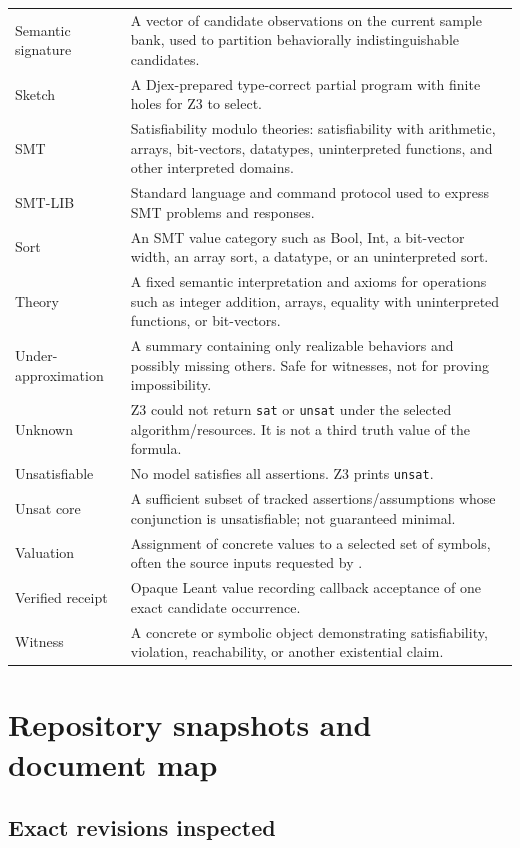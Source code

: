 \documentclass[10pt,letterpaper,oneside]{report}
\newcommand{\code}[1]{\texttt{\detokenize{#1}}}
\newcommand{\sat}{\texttt{sat}}
\newcommand{\unsat}{\texttt{unsat}}
\begin{document}
\begin{longtable}{@{}L{0.23\textwidth}L{0.71\textwidth}@{}}
Semantic signature & A vector of candidate observations on the current sample bank, used to partition behaviorally indistinguishable candidates. \\
Sketch & A Djex-prepared type-correct partial program with finite holes for Z3 to select. \\
SMT & Satisfiability modulo theories: satisfiability with arithmetic, arrays, bit-vectors, datatypes, uninterpreted functions, and other interpreted domains. \\
SMT-LIB & Standard language and command protocol used to express SMT problems and responses. \\
Sort & An SMT value category such as Bool, Int, a bit-vector width, an array sort, a datatype, or an uninterpreted sort. \\
Theory & A fixed semantic interpretation and axioms for operations such as integer addition, arrays, equality with uninterpreted functions, or bit-vectors. \\
Under-approximation & A summary containing only realizable behaviors and possibly missing others. Safe for witnesses, not for proving impossibility. \\
Unknown & Z3 could not return \sat{} or \unsat{} under the selected algorithm/resources. It is not a third truth value of the formula. \\
Unsatisfiable & No model satisfies all assertions. Z3 prints \unsat. \\
Unsat core & A sufficient subset of tracked assertions/assumptions whose conjunction is unsatisfiable; not guaranteed minimal. \\
Valuation & Assignment of concrete values to a selected set of symbols, often the source inputs requested by \code{get-value}. \\
Verified receipt & Opaque Leant value recording callback acceptance of one exact candidate occurrence. \\
Witness & A concrete or symbolic object demonstrating satisfiability, violation, reachability, or another existential claim. \\
\end{longtable}

\chapter{Repository snapshots and document map}
\label{app:sources}

\section{Exact revisions inspected}
\end{document}
